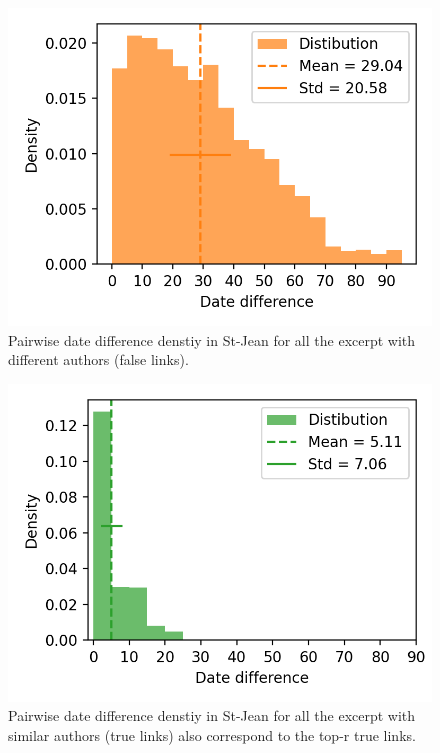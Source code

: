 \begin{figure}
  \includegraphics[width=\linewidth]{img/dates_differences_false.png}
  \caption{Pairwise date difference denstiy in St-Jean for all the excerpt with different authors (false links).}
  \label{fig:dates_differences_false}
\end{figure}
\begin{figure}
  \includegraphics[width=\linewidth]{img/dates_differences_r_true.png}
  \caption{Pairwise date difference denstiy in St-Jean for all the excerpt with similar authors (true links) also correspond to the top-r true links.}
  \label{fig:dates_differences_r_true}
\end{figure}

